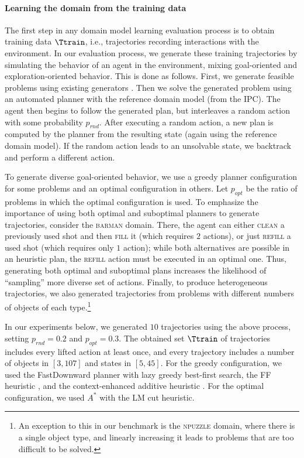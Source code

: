 \paragraph{Learning the domain from the training data} 
The first step in any domain model learning evaluation process is to obtain training data $\Ttrain$, i.e., trajectories recording interactions with the environment. 
In our evaluation process, we generate these training trajectories by simulating the behavior of an agent in the environment, mixing goal-oriented and exploration-oriented behavior. 
This is done as follows. 
First, we generate feasible problems using existing generators \citep{seipp-et-al-zenodo2022}. 
Then we solve the generated problem using an automated planner with the reference domain model (from the IPC). 
The agent then begins to follow the generated plan, but interleaves a random action with some probability $p_{rnd}$.  
After executing a random action, a new plan is computed by the planner from the resulting state (again using the reference domain model). If the random action leads to an unsolvable state, we backtrack and perform a different action. 

To generate diverse goal-oriented behavior, we use a greedy planner configuration for some problems and an optimal configuration in others. 
Let $p_{opt}$ be the ratio of problems in which the optimal configuration is used. 
To emphasize the importance of using both optimal and suboptimal planners to generate trajectories, consider the \textsc{barman} domain. 
There, the agent can either \textsc{clean} a previously used shot and then \textsc{fill} it (which requires $2$ actions), or just \textsc{refill} a used shot (which requires only $1$ action); while both alternatives are possible in an heuristic plan, the \textsc{refill} action must be executed in an optimal one. 
Thus, generating both optimal and suboptimal plans increases the likelihood of ``sampling'' more diverse set of actions. 
Finally, to produce heterogeneous trajectories, we also generated trajectories from problems with different numbers of objects of each type.\footnote{An exception to this in our benchmark is the \textsc{npuzzle} domain, where there is a single object type, and linearly increasing it leads to problems that are too difficult to be solved.} 


%


In our experiments below, we generated $10$ trajectories using the above process, 
setting $p_{rnd}=0.2$ and $p_{opt}=0.3$. 
The obtained set $\Ttrain$ of trajectories includes every lifted action at least once, and every trajectory includes a number of objects in $[3, 107]$ and states in $[5, 45]$. %
For the greedy configuration, we used the FastDownward planner \citep{helmert2006fast} with lazy greedy best-first search, the
FF heuristic \citep{hoffmann2001ff}, and the context-enhanced additive heuristic \citep{helmert2008unifying}. For the optimal configuration, we used $A^*$ with the LM cut heuristic. %



